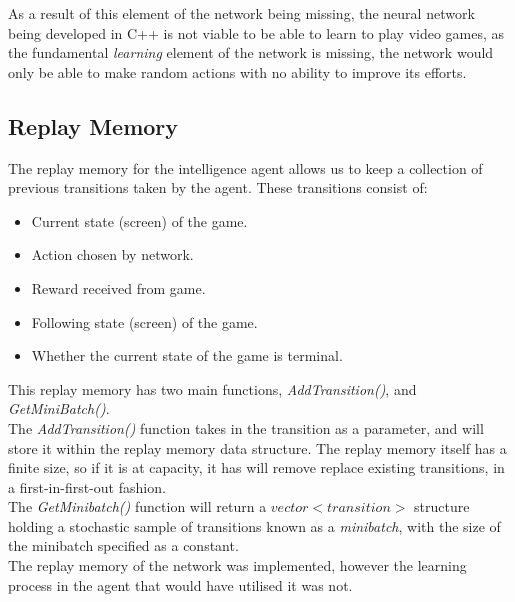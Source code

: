 \documentclass[10pt]{article}
\begin{document}
		
		As a result of this element of the network being missing, the neural network being developed in C++ is not viable to be able to learn to play video games, as the fundamental \textit{learning} element of the network is missing, the network would only be able to make random actions with no ability to improve its efforts.
	\medskip
	
	\subsection{Replay Memory}
		The replay memory for the intelligence agent allows us to keep a collection of previous transitions taken by the agent. These transitions consist of:
		\begin{itemize}
			\item Current state (screen) of the game.
			\item Action chosen by network.
			\item Reward received from game.
			\item Following state (screen) of the game.
			\item Whether the current state of the game is terminal.
		\end{itemize}
		
		This replay memory has two main functions, \textit{AddTransition()}, and \textit{GetMiniBatch()}.\\
		
		The \textit{AddTransition()} function takes in the transition as a parameter, and will store it within the replay memory data structure. The replay memory itself has a finite size, so if it is at capacity, it has will remove replace existing transitions, in a first-in-first-out fashion.\\
		
		The \textit{GetMinibatch()} function will return a $vector<transition>$ structure holding a stochastic sample of transitions known as a \textit{minibatch}, with the size of the minibatch specified as a constant.\\
		
		The replay memory of the network was implemented, however the learning process in the agent that would have utilised it was not.
	\medskip	
	
\end{document}
